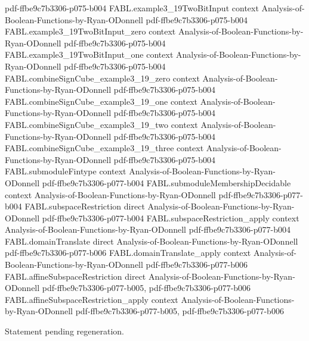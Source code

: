 \begin{theorem}
  {pdf-ffbe9c7b3306-p075-b004}
\proofstep
  {FABL.example3_19TwoBitInput}
  {context}
  {Analysis-of-Boolean-Functions-by-Ryan-ODonnell}
  {pdf-ffbe9c7b3306-p075-b004}
\proofstep
  {FABL.example3_19TwoBitInput_zero}
  {context}
  {Analysis-of-Boolean-Functions-by-Ryan-ODonnell}
  {pdf-ffbe9c7b3306-p075-b004}
\proofstep
  {FABL.example3_19TwoBitInput_one}
  {context}
  {Analysis-of-Boolean-Functions-by-Ryan-ODonnell}
  {pdf-ffbe9c7b3306-p075-b004}
\proofstep
  {FABL.combineSignCube_example3_19_zero}
  {context}
  {Analysis-of-Boolean-Functions-by-Ryan-ODonnell}
  {pdf-ffbe9c7b3306-p075-b004}
\proofstep
  {FABL.combineSignCube_example3_19_one}
  {context}
  {Analysis-of-Boolean-Functions-by-Ryan-ODonnell}
  {pdf-ffbe9c7b3306-p075-b004}
\proofstep
  {FABL.combineSignCube_example3_19_two}
  {context}
  {Analysis-of-Boolean-Functions-by-Ryan-ODonnell}
  {pdf-ffbe9c7b3306-p075-b004}
\proofstep
  {FABL.combineSignCube_example3_19_three}
  {context}
  {Analysis-of-Boolean-Functions-by-Ryan-ODonnell}
  {pdf-ffbe9c7b3306-p075-b004}
\proofstep
  {FABL.submoduleFintype}
  {context}
  {Analysis-of-Boolean-Functions-by-Ryan-ODonnell}
  {pdf-ffbe9c7b3306-p077-b004}
\proofstep
  {FABL.submoduleMembershipDecidable}
  {context}
  {Analysis-of-Boolean-Functions-by-Ryan-ODonnell}
  {pdf-ffbe9c7b3306-p077-b004}
\proofstep
  {FABL.subspaceRestriction}
  {direct}
  {Analysis-of-Boolean-Functions-by-Ryan-ODonnell}
  {pdf-ffbe9c7b3306-p077-b004}
\proofstep
  {FABL.subspaceRestriction_apply}
  {context}
  {Analysis-of-Boolean-Functions-by-Ryan-ODonnell}
  {pdf-ffbe9c7b3306-p077-b004}
\proofstep
  {FABL.domainTranslate}
  {direct}
  {Analysis-of-Boolean-Functions-by-Ryan-ODonnell}
  {pdf-ffbe9c7b3306-p077-b006}
\proofstep
  {FABL.domainTranslate_apply}
  {context}
  {Analysis-of-Boolean-Functions-by-Ryan-ODonnell}
  {pdf-ffbe9c7b3306-p077-b006}
\proofstep
  {FABL.affineSubspaceRestriction}
  {direct}
  {Analysis-of-Boolean-Functions-by-Ryan-ODonnell}
  {pdf-ffbe9c7b3306-p077-b005,
    pdf-ffbe9c7b3306-p077-b006}
\proofstep
  {FABL.affineSubspaceRestriction_apply}
  {context}
  {Analysis-of-Boolean-Functions-by-Ryan-ODonnell}
  {pdf-ffbe9c7b3306-p077-b005,
    pdf-ffbe9c7b3306-p077-b006}

Statement pending regeneration.
\end{theorem}

